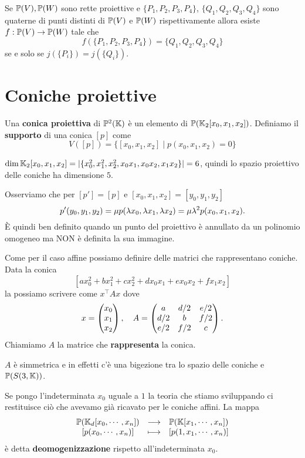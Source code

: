 \begin{multicols*}{2}
    \begin{theorem}
    Se ${\mathbb{P}(V)},{\mathbb{P}(W)}$ sono rette proiettive e $\{P_1,P_2,P_3,P_4\}$, $\{Q_1,Q_2,Q_3,Q_4\}$ sono quaterne di punti distinti di ${\mathbb{P}(V)}$ e ${\mathbb{P}(W)}$ rispettivamente allora esiste $f:{\mathbb{P}(V)}\to{\mathbb{P}(W)}$ tale che
    \[f(\{P_1,P_2,P_3,P_4\})=\{Q_1,Q_2,Q_3,Q_4\}\]
    se e solo se $j(\{P_i\})=j(\{Q_i\})$.
    \end{theorem}

    \section{Coniche proiettive}
    \begin{definition}
    Una \textbf{conica proiettiva} di $\mathbb{P}^2(\mathbb{K})$ \`e un elemento di $\mathbb{P}(\mathbb{K}_2[x_0,x_1,x_2])$. Definiamo il \textbf{supporto} di una conica $[p]$ come
    \[V([p])=\{[x_0,x_1,x_2]\mid p(x_0, x_1, x_2)=0\}\]
    \end{definition}
    \begin{remark}
    $\dim\mathbb{K}_2[x_0,x_1,x_2]=|\{x_0^2,x_1^2,x_2^2,x_0x_1,x_0x_2,x_1x_2\}|=6$, quindi lo spazio proiettivo delle coniche ha dimensione $5$.
    \end{remark}
    \begin{remark}
    Osserviamo che per $[p']=[p]$ e $[x_0,x_1,x_2]=[y_0,y_1,y_2]$
    \[p'(y_0,y_1,y_2)=\mu p(\lambda x_0,\lambda x_1, \lambda x_2)=\mu\lambda^2p(x_0,x_1,x_2).\]
    \`E quindi ben definito quando un punto del proiettivo \`e annullato da un polinomio omogeneo ma NON \`e definita la sua immagine.
    \end{remark}

    \noindent
    Come per il caso affine possiamo definire delle matrici che rappresentano coniche. Data la conica
    \[[ax_0^2+bx_1^2+cx_2^2+dx_0x_1+ex_0x_2+fx_1x_2]\]
    la possiamo scrivere come $x^\top A x$ dove
    \[x=\begin{pmatrix}x_0\\ x_1\\ x_2\end{pmatrix},\quad A=\begin{pmatrix}a & d/2 & e/2\\ d/2 & b & f/2\\ e/2 & f/2 & c\end{pmatrix}.\]
    Chiamiamo $A$ la matrice che \textbf{rappresenta} la conica.
    \begin{remark}
    $A$ \`e simmetrica e in effetti c'\`e una bigezione tra lo spazio delle coniche e $\mathbb{P}(S(3,\mathbb{K}))$.
    \end{remark}
    \begin{remark}
    Se pongo l'indeterminata $x_0$ uguale a $1$ la teoria che stiamo sviluppando ci restituisce ci\`o che avevamo gi\`a ricavato per le coniche affini. La mappa
    \[\begin{array}{ccc} {\mathbb{P}(\mathbb{K}_d[x_0,\cdots,x_n])} & \longrightarrow & {\mathbb{P}(\mathbb{K}[x_1,\cdots, x_n])}\\ {[p(x_0,\cdots,x_n)]} & \longmapsto & {[p(1,x_1,\cdots,x_n)]} \end{array}\]
    \`e detta \textbf{deomogenizzazione} rispetto all'indeterminata $x_0$.
    \end{remark}



\end{multicols*}

